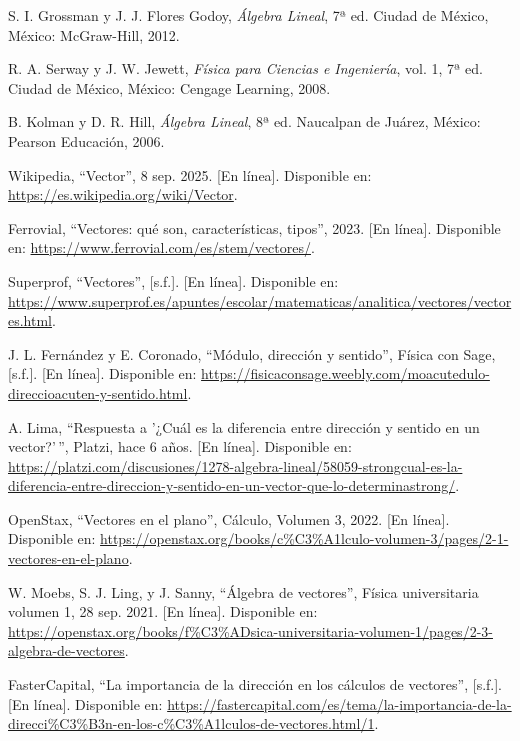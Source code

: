 \documentclass[12pt,a4paper]{article}
\begin{document}
\newpage

\begin{thebibliography}{20}

S. I. Grossman y J. J. Flores Godoy, \emph{Álgebra Lineal}, 7ª ed. Ciudad de México, México: McGraw-Hill, 2012.

R. A. Serway y J. W. Jewett, \emph{Física para Ciencias e Ingeniería}, vol. 1, 7ª ed. Ciudad de México, México: Cengage Learning, 2008.

B. Kolman y D. R. Hill, \emph{Álgebra Lineal}, 8ª ed. Naucalpan de Juárez, México: Pearson Educación, 2006.

Wikipedia, ``Vector'', 8 sep. 2025. [En línea]. Disponible en: \url{https://es.wikipedia.org/wiki/Vector}.

Ferrovial, ``Vectores: qué son, características, tipos'', 2023. [En línea]. Disponible en: \url{https://www.ferrovial.com/es/stem/vectores/}.

Superprof, ``Vectores'', [s.f.]. [En línea]. Disponible en: \url{https://www.superprof.es/apuntes/escolar/matematicas/analitica/vectores/vectores.html}.

J. L. Fernández y E. Coronado, ``Módulo, dirección y sentido'', Física con Sage, [s.f.]. [En línea]. Disponible en: \url{https://fisicaconsage.weebly.com/moacutedulo-direccioacuten-y-sentido.html}.

A. Lima, ``Respuesta a '¿Cuál es la diferencia entre dirección y sentido en un vector?'\,'', Platzi, hace 6 años. [En línea]. Disponible en: \url{https://platzi.com/discusiones/1278-algebra-lineal/58059-strongcual-es-la-diferencia-entre-direccion-y-sentido-en-un-vector-que-lo-determinastrong/}.

OpenStax, ``Vectores en el plano'', Cálculo, Volumen 3, 2022. [En línea]. Disponible en: \url{https://openstax.org/books/c%C3%A1lculo-volumen-3/pages/2-1-vectores-en-el-plano}.

W. Moebs, S. J. Ling, y J. Sanny, ``Álgebra de vectores'', Física universitaria volumen 1, 28 sep. 2021. [En línea]. Disponible en: \url{https://openstax.org/books/f%C3%ADsica-universitaria-volumen-1/pages/2-3-algebra-de-vectores}.

FasterCapital, ``La importancia de la dirección en los cálculos de vectores'', [s.f.]. [En línea]. Disponible en: \url{https://fastercapital.com/es/tema/la-importancia-de-la-direcci%C3%B3n-en-los-c%C3%A1lculos-de-vectores.html/1}.


\end{thebibliography}
\end{document}
